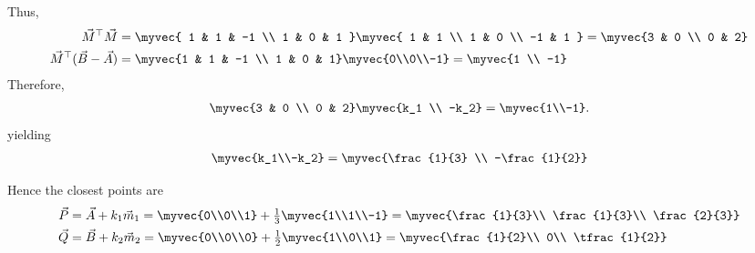 Thus,
\begin{align}
\vec{M}^\top\vec{M} &= 
\myvec{
1 & 1 & -1 \\
1 & 0 & 1
}
\myvec{
1 & 1 \\
1 & 0 \\
-1 & 1
} = \myvec{3 & 0 \\ 0 & 2} \\
\vec{M}^\top(\vec{B}-\vec{A}) &= 
\myvec{1 & 1 & -1 \\ 1 & 0 & 1}
\myvec{0\\0\\-1} 
= \myvec{1 \\ -1}
\end{align}
Therefore,
\begin{align}
\myvec{3 & 0 \\ 0 & 2}
\myvec{k_1 \\ -k_2}
= \myvec{1\\-1}.
\end{align}
yielding
\begin{align}
  \myvec{k_1\\-k_2} = \myvec{\frac{1}{3} \\ -\frac{1}{2}}
\end{align}

Hence the closest points are
\begin{align}
\vec{P} &= \vec{A} + k_1\vec{m}_1 
= \myvec{0\\0\\1} + \tfrac{1}{3}\myvec{1\\1\\-1}
= \myvec{\frac{1}{3}\\ \frac{1}{3}\\ \frac{2}{3}} \\
\vec{Q} &= \vec{B} + k_2\vec{m}_2 
= \myvec{0\\0\\0} + \tfrac{1}{2}\myvec{1\\0\\1}
= \myvec{\frac{1}{2}\\ 0\\ \tfrac{1}{2}}
\end{align}

